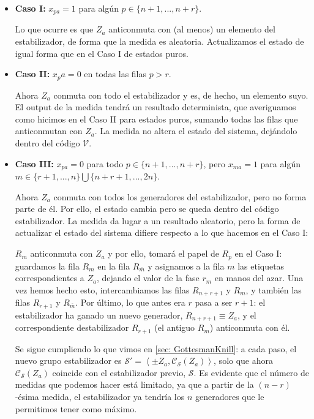 \documentclass[11pt,a4paper,twoside,pdf]{article}
\numberwithin{equation}{section}
\begin{document}
			\begin{itemize}[leftmargin=0.6cm]
				
				\item[] \textbf{Caso I: } $x_{pa}=1$ para algún $p \in \{n+1,...,n+r\}$. 
				
					Lo que ocurre es que $Z_a$ anticonmuta con (al menos) un elemento del estabilizador, de forma que la medida es aleatoria. Actualizamos el estado de igual forma que en el Caso I de estados puros.
					
				\item[] \textbf{Caso II: } $x_pa=0$ en todas las filas $p>r$.
				
					Ahora $Z_a$ conmuta con todo el estabilizador y es, de hecho, un elemento suyo. El output de la medida tendrá un resultado determinista, que averiguamos como hicimos en el Caso II para estados puros, sumando todas las filas que anticonmutan con $Z_a$. La medida no altera el estado del sistema, dejándolo dentro del código $\mathcal{V}$. 
					
				\item[] \textbf{Caso III: } $x_{pa}=0$ para todo $p\in \{n+1,...,n+r\}$, pero $x_{ma}=1$ para algún $m\in \{r+1,...,n\}\bigcup\{n+r+1,...,2n\}$. 
				
					Ahora $Z_a$ conmuta con todos los generadores del estabilizador, pero no forma parte de él. Por ello, el estado cambia pero se queda dentro del código estabilizador. La medida da lugar a un resultado aleatorio, pero la forma de actualizar el estado del sistema difiere respecto a lo que hacemos en el Caso I:
					
					$R_m$ anticonmuta con $Z_a$ y por ello, tomará el papel de $R_p$ en el Caso I: guardamos la fila $R_m$ en la fila $R_{\overline{m}}$ y asignamos a la fila $m$ las etiquetas correspondientes a $Z_a$, dejando el valor de la fase $r_m$ en manos del azar. Una vez hemos hecho esto, intercambiamos las filas $R_{n+r+1}$ y $R_m$, y también las filas $R_{r+1}$ y $R_{\overline{m}}$. Por último, lo que antes era $r$ pasa a ser $r+1$: el estabilizador ha ganado un nuevo generador, $R_{n+r+1} \equiv Z_a$, y el correspondiente destabilizador $R_{r+1}$ (el antiguo $R_m$) anticonmuta con él.
					
					Se sigue cumpliendo lo que vimos en \ref{sec: GottesmanKnill}: a cada paso, el nuevo grupo estabilizador es $\mathcal{S}'=\left\langle \pm Z_a, \mathcal{C}_\mathcal{S}(Z_a) \right\rangle$, solo que ahora $\mathcal{C}_\mathcal{S}(Z_a)$ coincide con el estabilizador previo, $\mathcal{S}$. Es evidente que el número de medidas que podemos hacer está limitado, ya que a partir de la $(n-r)$-ésima medida, el estabilizador ya tendría los $n$ generadores que le permitimos tener como máximo.
			\end{itemize}
		
\end{document}

